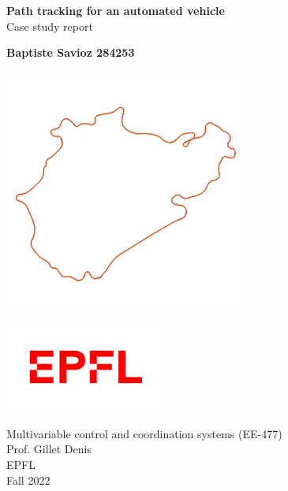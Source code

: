 \begin{titlepage}
    \begin{center}

        \Huge
        \textbf{Path tracking for an automated vehicle}\\
        \vspace{0.3cm}
        Case study report
        \vspace{0.5cm}
        \LARGE
        
            
        \vspace{1.5cm}

        \textbf{Baptiste Savioz 284253}\\

        \vfill

        \includegraphics[width=0.6\textwidth]{Latex report/image/titre.png}
            
        \vspace{0.8cm}
        
        \includegraphics[width=0.4\textwidth]{Latex report/image/epfl.png}
        
        \Large
        Multivariable control and coordination systems (EE-477)\\
        Prof. Gillet Denis\\
        EPFL\\
        Fall 2022
            
    \end{center}
\end{titlepage}